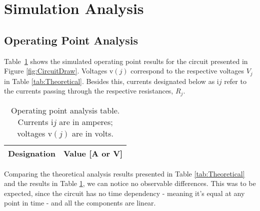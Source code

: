 \section{Simulation Analysis}
\label{sec:simulation}

\subsection{Operating Point Analysis}

Table~\ref{tab:op} shows the simulated operating point results for the circuit presented in Figure \ref{fig:CircuitDraw}. Voltages v$(j)$ correspond to the respective voltages $V_j$ in Table \ref{tab:Theoretical}. Besides this, currents designated below as i$j$ refer to the currents passing through the respective resistances, $R_j$.



\begin{table}[H]
  \centering
  \begin{tabular}{|c|c|}
    \hline    
    {\bf Designation} & {\bf Value [A or V]} \\ \hline
    
  \end{tabular}
  \caption{Operating point analysis table. Currents i$j$ are in amperes; voltages v$(j)$ are in volts.}
  \label{tab:op}
\end{table}

Comparing the theoretical analysis results presented in Table \ref{tab:Theoretical} and the results in Table \ref{tab:op}, we can notice no observable differences. This was to be expected, since the circuit has no time dependency - meaning it's equal at any point in time - and all the components are linear.
